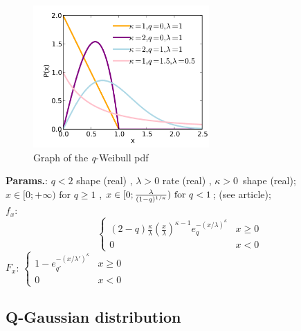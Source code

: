     \begin{figure}[H]
        \centering
        \includegraphics[width=0.6\textwidth]{images/QWeibull pdf.png}
        \caption{Graph of the \textit{q}-Weibull pdf}
    \end{figure}




    {\color{darkblue} \textbf{Params.}:} {$q < 2 $ shape (real) ,  $ \lambda > 0 $ rate (real) ,  $\kappa>0\,$ shape (real)}; {$x \in [0; +\infty)\! \text{ for }q \ge 1 $ ,  $ x \in [0; {\lambda \over {(1-q)^{1/\kappa}}}) \text{ for } q<1 $}; {(see article)};\hspace{0.5cm}\\{\color{darkblue} \textbf{$f_x$}:} {$$\begin{cases}
(2-q)\frac{\kappa}{\lambda}\left(\frac{x}{\lambda}\right)^{\kappa-1}e_{q}^{-(x/\lambda)^{\kappa}} & x\geq0\\
0 & x<0\end{cases}$$}{\color{darkblue} \textbf{$F_x$}:} {$\begin{cases}1- e_{q'}^{-(x/\lambda')^\kappa} & x\geq0\\ 0 & x<0\end{cases}$}



    
        
\subsection{Q-Gaussian distribution}


